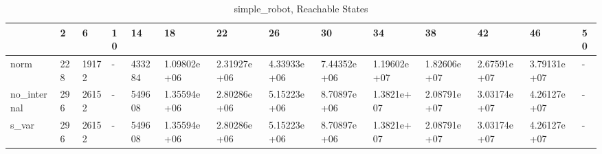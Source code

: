 \begin{table}
\caption{simple_robot, Reachable States}
\label{simple_robot_reach}
\begin{tabular}{llllllllllllll}
\toprule
 & 2 & 6 & 10 & 14 & 18 & 22 & 26 & 30 & 34 & 38 & 42 & 46 & 50 \\
\midrule
norm & 228 & 19172 & - & 433284 & 1.09802e+06 & 2.31927e+06 & 4.33933e+06 & 7.44352e+06 & 1.19602e+07 & 1.82606e+07 & 2.67591e+07 & 3.79131e+07 & - \\
no_internal & 296 & 26152 & - & 549608 & 1.35594e+06 & 2.80286e+06 & 5.15223e+06 & 8.70897e+06 & 1.3821e+07 & 2.08791e+07 & 3.03174e+07 & 4.26127e+07 & - \\
s_var & 296 & 26152 & - & 549608 & 1.35594e+06 & 2.80286e+06 & 5.15223e+06 & 8.70897e+06 & 1.3821e+07 & 2.08791e+07 & 3.03174e+07 & 4.26127e+07 & - \\
\bottomrule
\end{tabular}
\end{table}
